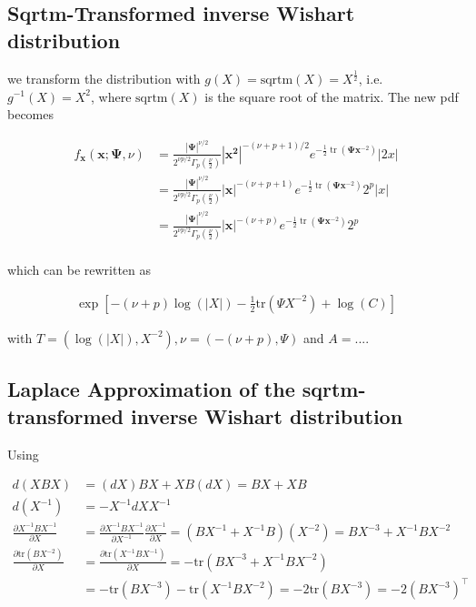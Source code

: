 \subsection{Sqrtm-Transformed inverse Wishart distribution}

we transform the distribution with $g(X) = \text{sqrtm}(X) = X^{\frac{1}{2}}$, i.e. $g^{-1}(X) = X^2$, where $\text{sqrtm}(X)$ is the square root of the matrix. The new pdf becomes 

\begin{align*}
	f_{\mathbf x}({\mathbf x}; {\mathbf \Psi}, \nu) &= \frac{\left|{\mathbf\Psi}\right|^{\nu/2}}{2^{\nu p/2}\Gamma_p(\frac \nu 2)} \left|\mathbf{x^2}\right|^{-(\nu+p+1)/2} e^{-\frac{1}{2}\operatorname{tr}(\mathbf\Psi\mathbf{x}^{-2})} |2x| \\
	&= \frac{\left|{\mathbf\Psi}\right|^{\nu/2}}{2^{\nu p/2}\Gamma_p(\frac \nu 2)} \left|\mathbf{x}\right|^{-(\nu+p+1)} e^{-\frac{1}{2}\operatorname{tr}(\mathbf\Psi\mathbf{x}^{-2})} 2^p|x| \\
	&= \frac{\left|{\mathbf\Psi}\right|^{\nu/2}}{2^{\nu p/2}\Gamma_p(\frac \nu 2)} \left|\mathbf{x}\right|^{-(\nu+p)} e^{-\frac{1}{2}\operatorname{tr}(\mathbf\Psi\mathbf{x}^{-2})} 2^p \\
	\label{eq:sqrtm_inverse_wishart_pdf}
\end{align*}

which can be rewritten as 

\begin{align*}
	\exp\left[-(\nu + p) \log(|X|) - \frac{1}{2}\text{tr}(\Psi X^{-2}) + \log(C)\right]
\end{align*}

with $T = (\log(|X|), X^{-2}), \nu = (-(\nu + p), \Psi)$ and $A = ...$. 

\subsection{Laplace Approximation of the sqrtm-transformed inverse Wishart distribution}

Using 

\begin{align*}
	d(XBX) &= (dX)BX + XB(dX) = BX + XB \\
	d(X^{-1}) &= -X^{-1} dX X^{-1} \\
	\frac{\partial X^{-1}BX^{-1}}{\partial X} &= \frac{\partial X^{-1}BX^{-1}}{\partial X^{-1}} \frac{\partial X^{-1}}{\partial X} = (BX^{-1} + X^{-1}B)(X^{-2}) = BX^{-3} + X^{-1}BX^{-2} \\
	\frac{\partial \text{tr}(BX^{-2})}{\partial X} &= 	\frac{\partial \text{tr}(X^{-1}BX^{-1})}{\partial X} = -\text{tr}(BX^{-3} + X^{-1}BX^{-2}) \\
	&= -\text{tr}(BX^{-3}) -\text{tr}(X^{-1}BX^{-2}) = -2\text{tr}(BX^{-3}) = -2(BX^{-3})^\top
\end{align*}

